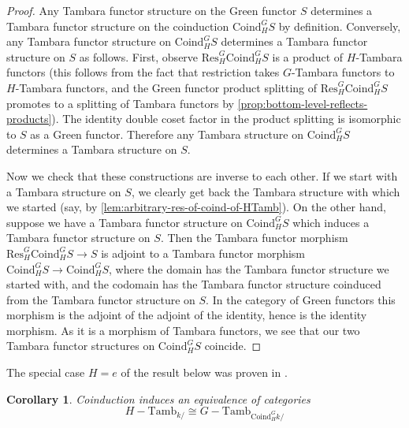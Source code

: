 \documentclass[11pt,dvipsnames]{amsart}
\newtheorem{corollary}[theorem]{Corollary}
\theoremstyle{BoldRemark}
\newcommand{\Tamb}{\mathrm{Tamb}}
\begin{document}
\begin{proof}
	Any Tambara functor structure on the Green functor $S$ determines a Tambara functor structure on the coinduction $\mathrm{Coind}_H^G S$ by definition. Conversely, any Tambara functor structure on $\mathrm{Coind}_H^G S$ determines a Tambara functor structure on $S$ as follows. First, observe $\mathrm{Res}_H^G \mathrm{Coind}_H^G S$ is a product of $H$-Tambara functors (this follows from the fact that restriction takes $G$-Tambara functors to $H$-Tambara functors, and the Green functor product splitting of $\mathrm{Res}_H^G \mathrm{Coind}_H^G S$ promotes to a splitting of Tambara functors by \cref{prop:bottom-level-reflects-products}). The identity double coset factor in the product splitting is isomorphic to $S$ as a Green functor. Therefore any Tambara structure on $\mathrm{Coind}_H^G S$ determines a Tambara structure on $S$.
	
	Now we check that these constructions are inverse to each other. If we start with a Tambara structure on $S$, we clearly get back the Tambara structure with which we started (say, by \cref{lem:arbitrary-res-of-coind-of-HTamb}). On the other hand, suppose we have a Tambara functor structure on $\mathrm{Coind}_H^G S$ which induces a Tambara functor structure on $S$. Then the Tambara functor morphism $\mathrm{Res}_H^G \mathrm{Coind}_H^G S \rightarrow S$ is adjoint to a Tambara functor morphism $\mathrm{Coind}_H^G S \rightarrow \mathrm{Coind}_H^G S$, where the domain has the Tambara functor structure we started with, and the codomain has the Tambara functor structure coinduced from the Tambara functor structure on $S$. In the category of Green functors this morphism is the adjoint of the adjoint of the identity, hence is the identity morphism. As it is a morphism of Tambara functors, we see that our two Tambara functor structures on $\mathrm{Coind}_H^G S$ coincide.
\end{proof}

The special case $H = e$ of the result below was proven in \cite{SSW24}.

\begin{corollary}\label{cor:coind-gives-equiv-of-Tamb-algebra-cats}
	Coinduction induces an equivalence of categories \[ H {-} \Tamb_{k/} \cong G {-} \Tamb_{\mathrm{Coind}_H^G k /} \]
\end{corollary}
\end{document}
